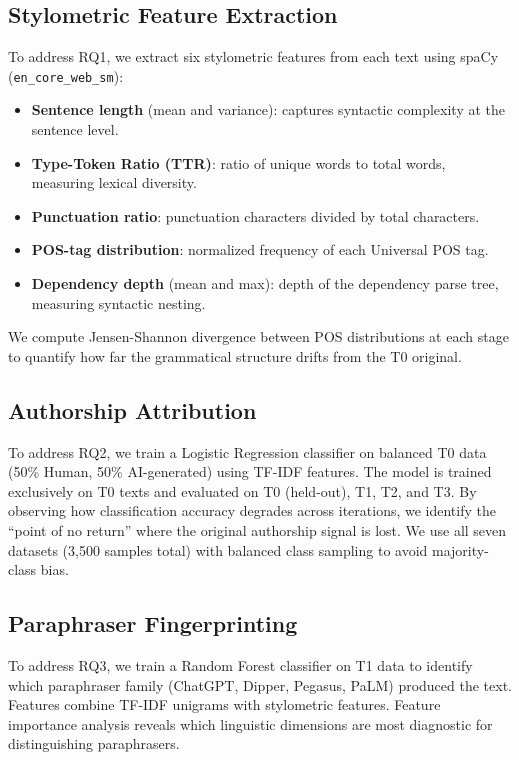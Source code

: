\documentclass[10pt,twocolumn]{article}
\begin{document}
\subsection{Stylometric Feature Extraction}
To address RQ1, we extract six stylometric features from each text using
spaCy (\texttt{en\_core\_web\_sm}):

\begin{itemize}[leftmargin=*,topsep=2pt,itemsep=1pt]
  \item \textbf{Sentence length} (mean and variance): captures syntactic complexity at the sentence level.
  \item \textbf{Type-Token Ratio (TTR)}: ratio of unique words to total words, measuring lexical diversity.
  \item \textbf{Punctuation ratio}: punctuation characters divided by total characters.
  \item \textbf{POS-tag distribution}: normalized frequency of each Universal POS tag.
  \item \textbf{Dependency depth} (mean and max): depth of the dependency parse tree, measuring syntactic nesting.
\end{itemize}

\noindent We compute Jensen-Shannon divergence between POS distributions at each
stage to quantify how far the grammatical structure drifts from the T0
original.

\subsection{Authorship Attribution}
To address RQ2, we train a Logistic Regression classifier on balanced
T0 data (50\% Human, 50\% AI-generated) using TF-IDF features. The model
is trained exclusively on T0 texts and evaluated on T0 (held-out), T1,
T2, and T3. By observing how classification accuracy degrades across
iterations, we identify the ``point of no return'' where the original
authorship signal is lost. We use all seven datasets (3,500 samples total)
with balanced class sampling to avoid majority-class bias.

\subsection{Paraphraser Fingerprinting}
To address RQ3, we train a Random Forest classifier on T1 data to identify
which paraphraser family (ChatGPT, Dipper, Pegasus, PaLM) produced the
text. Features combine TF-IDF unigrams with stylometric features. Feature
importance analysis reveals which linguistic dimensions are most diagnostic
for distinguishing paraphrasers.
\end{document}

